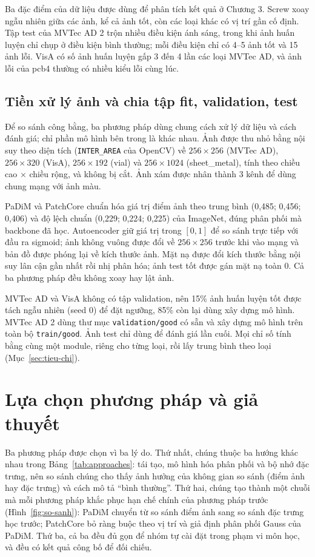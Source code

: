 Ba đặc điểm của dữ liệu được dùng để phân tích kết quả ở Chương 3. Screw xoay ngẫu nhiên giữa các ảnh, kể cả ảnh
tốt, còn các loại khác có vị trí gần cố định. Tập test của MVTec AD 2 trộn nhiều điều kiện ánh sáng, trong khi ảnh
huấn luyện chỉ chụp ở điều kiện bình thường; mỗi điều kiện chỉ có 4--5 ảnh tốt và 15 ảnh lỗi. VisA có số ảnh huấn
luyện gấp 3 đến 4 lần các loại MVTec AD, và ảnh lỗi của pcb4 thường có nhiều kiểu lỗi cùng lúc.

\subsection{Tiền xử lý ảnh và chia tập fit, validation, test}
\label{sec:preprocess}

Để so sánh công bằng, ba phương pháp dùng chung cách xử lý dữ liệu và cách đánh giá; chỉ phần mô hình bên trong là
khác nhau. Ảnh được thu nhỏ bằng nội suy theo diện tích (\texttt{INTER\_AREA} của OpenCV) về $256\times256$ (MVTec
AD), $256\times320$ (VisA), $256\times192$ (vial) và $256\times1024$ (sheet\_metal), tính theo chiều cao $\times$
chiều rộng, và không bị cắt. Ảnh xám được nhân thành 3 kênh để dùng chung mạng với ảnh màu.

PaDiM và PatchCore chuẩn hóa giá trị điểm ảnh theo trung bình (0,485; 0,456; 0,406) và độ lệch chuẩn (0,229; 0,224;
0,225) của ImageNet, đúng phân phối mà backbone đã học. Autoencoder giữ giá trị trong $[0,1]$ để so sánh trực tiếp
với đầu ra sigmoid; ảnh không vuông được đổi về $256\times256$ trước khi vào mạng và bản đồ được phóng lại về kích
thước ảnh. Mặt nạ được đổi kích thước bằng nội suy lân cận gần nhất rồi nhị phân hóa; ảnh test tốt được gán mặt nạ
toàn 0. Cả ba phương pháp đều không xoay hay lật ảnh.

MVTec AD và VisA không có tập validation, nên 15\% ảnh huấn luyện tốt được tách ngẫu nhiên (seed 0) để đặt ngưỡng,
85\% còn lại dùng xây dựng mô hình. MVTec AD 2 dùng thư mục \texttt{validation/good} có sẵn và xây dựng mô hình trên
toàn bộ \texttt{train/good}. Ảnh test chỉ dùng để đánh giá lần cuối. Mọi chỉ số tính bằng cùng một module, riêng cho
từng loại, rồi lấy trung bình theo loại (Mục~\ref{sec:tieu-chi}).

\section{Lựa chọn phương pháp và giả thuyết}
\label{sec:chon-pp}

Ba phương pháp được chọn vì ba lý do. Thứ nhất, chúng thuộc ba hướng khác nhau trong Bảng~\ref{tab:approaches}:
tái tạo, mô hình hóa phân phối và bộ nhớ đặc trưng, nên so sánh chúng cho thấy ảnh hưởng của không gian so sánh
(điểm ảnh hay đặc trưng) và cách mô tả ``bình thường''. Thứ hai, chúng tạo thành một chuỗi mà mỗi phương pháp khắc
phục hạn chế chính của phương pháp trước (Hình~\ref{fig:so-sanh}): PaDiM chuyển từ so sánh điểm ảnh sang so sánh đặc
trưng học trước; PatchCore bỏ ràng buộc theo vị trí và giả định phân phối Gauss của PaDiM. Thứ ba, cả ba đều đủ
gọn để nhóm tự cài đặt trong phạm vi môn học, và đều có kết quả công bố để đối chiếu.

